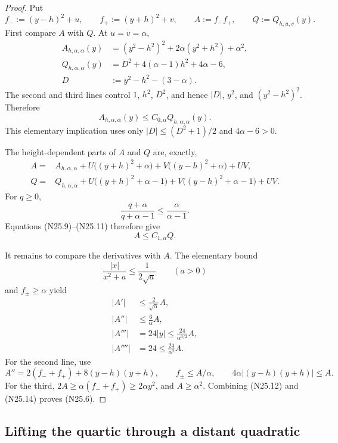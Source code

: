 \documentclass[11pt]{article}
\theoremstyle{definition}
\theoremstyle{remark}
\begin{document}
\begin{proof}
Put
\[
 f_-:=(y-h)^2+u,\qquad f_+:=(y+h)^2+v,
 \qquad A:=f_-f_+,\qquad Q:=Q_{h,u,v}(y).
 \tag{N25.7}
\]
First compare \(A\) with \(Q\).  At \(u=v=\alpha\),
\[
\begin{aligned}
 A_{h,\alpha,\alpha}(y)
 &=(y^2-h^2)^2+2\alpha(y^2+h^2)+\alpha^2,\\
 Q_{h,\alpha,\alpha}(y)
 &=D^2+4(\alpha-1)h^2+4\alpha-6,\\
 D&:=y^2-h^2-(3-\alpha).
\end{aligned}
\tag{N25.8}
\]
The second and third lines control \(1\), \(h^2\), \(D^2\), and hence
\(|D|\), \(y^2\), and \((y^2-h^2)^2\).  Therefore
\[
 A_{h,\alpha,\alpha}(y)
 \leq C_{0,\alpha}Q_{h,\alpha,\alpha}(y).
 \tag{N25.9}
\]
This elementary implication uses only
\(|D|\leq(D^2+1)/2\) and \(4\alpha-6>0\).

The height-dependent parts of \(A\) and \(Q\) are, exactly,
\[
\begin{aligned}
 A={}&A_{h,\alpha,\alpha}
 +U\bigl((y+h)^2+\alpha\bigr)
 +V\bigl((y-h)^2+\alpha\bigr)+UV,\\
 Q={}&Q_{h,\alpha,\alpha}
 +U\bigl((y+h)^2+\alpha-1\bigr)
 +V\bigl((y-h)^2+\alpha-1\bigr)+UV.
\end{aligned}
\tag{N25.10}
\]
For \(q\geq0\),
\[
 \frac{q+\alpha}{q+\alpha-1}\leq
 \frac{\alpha}{\alpha-1}.
 \tag{N25.11}
\]
Equations \textup{(N25.9)}--\textup{(N25.11)} therefore give
\[
 A\leq C_{1,\alpha}Q.
 \tag{N25.12}
\]

It remains to compare the derivatives with \(A\).  The elementary bound
\[
 \frac{|x|}{x^2+a}\leq\frac1{2\sqrt a}
 \qquad(a>0)
 \tag{N25.13}
\]
and \(f_\pm\geq\alpha\) yield
\[
\begin{aligned}
 |A'|&\leq\frac{2}{\sqrt\alpha}A,\\
 |A''|&\leq\frac6\alpha A,\\
 |A'''|&=24|y|\leq\frac{24}{\alpha^{3/2}}A,\\
 |A''''|&=24\leq\frac{24}{\alpha^2}A.
\end{aligned}
\tag{N25.14}
\]
For the second line, use
\[
 A''=2(f_-+f_+)+8(y-h)(y+h),\qquad
 f_\pm\leq A/\alpha,\qquad
 4\alpha|(y-h)(y+h)|\leq A.
 \tag{N25.15}
\]
For the third, \(2A\geq\alpha(f_-+f_+)\geq2\alpha y^2\), and
\(A\geq\alpha^2\).  Combining \textup{(N25.12)} and
\textup{(N25.14)} proves \textup{(N25.6)}.
\end{proof}

\subsection{Lifting the quartic through a distant quadratic}
\label{subsec:f2v25-lift}
\end{document}
